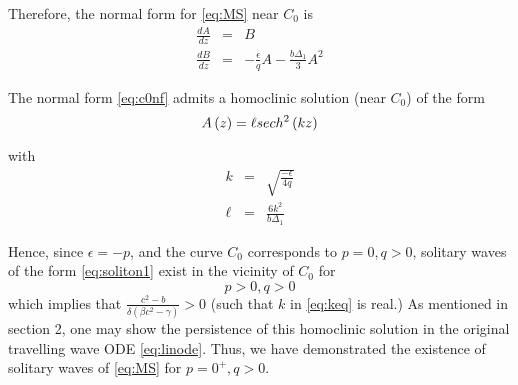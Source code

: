 Therefore, the normal form for \eqref{eq:MS} near $C_0$ is
\begin{subequations}
\begin{eqnarray}
\frac{dA}{dz} &=& B \\
\frac{dB}{dz} &=& -\frac{\epsilon}{q} A - \frac{ b \Delta_1}{3}  A^2
\end{eqnarray}
\end{subequations}

The normal form \eqref{eq:c0nf} admits a homoclinic solution (near $C_0$) of the form 
\begin{equation} \label{eq:soliton1}
A\left(z\right) = \ell \space sech^2\left(k z\right)
\end{equation}

with 
\begin{subequations} 
\begin{eqnarray}
k &=& \sqrt{\frac{-\epsilon}{4q}} \label{eq:keq} \\
\ell &=& \frac{ 6 k^2 }{ b \Delta_1 } 
\end{eqnarray}
\end{subequations}


Hence, since $\epsilon = - p $, and the curve $C_0$ corresponds to $p=0,q>0$, solitary waves of the 
form \eqref{eq:soliton1} exist in the vicinity of $C_0$ for 
\begin{equation}
p > 0, q > 0 
\end{equation}
which implies that $  \frac{c^2 - b}{\delta\left(\beta c^2 - \gamma\right)} > 0 $
(such that $k$ in \eqref{eq:keq} is real.)  As mentioned in section 2, one may show the persistence
of this homoclinic solution in the original travelling wave ODE \eqref{eq:linode}. Thus, we have 
demonstrated the existence of solitary waves of \eqref{eq:MS} for $p=0^+, q>0$. 

